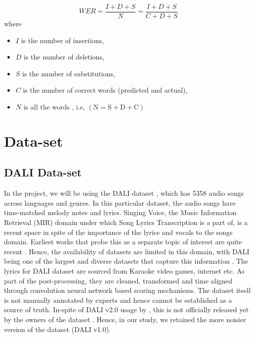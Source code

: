 $$
W E R=\frac{I + D + S}{N}=\frac{I+D+S}{C+D+S}
$$
where

\begin{itemize}
    \item $I$ is the number of insertions,
    \item $D$ is the number of deletions,
    \item $S$ is the number of substitutions,
    \item $C$ is the number of correct words (predicted and actual),
    
    \item $N$ is all the words , i.e, $(\mathrm{N}=\mathrm{S}+\mathrm{D}+\mathrm{C})$
\end{itemize}


\section{Data-set}%
\label{sec:dataset}

\subsection{DALI Data-set}
\label{subsec:dalidataset}

In the project, we will be using the DALI dataset \cite{meseguer2020creating}, which has 5358 audio songs across languages and genres. In this particular dataset, the audio songs have time-matched melody notes and lyrics. Singing Voice, the Music Information Retrieval (MIR) domain under which Song Lyrics Transcription is a part of, is a recent space in spite of the importance of the lyrics and vocals to the songs domain. Earliest works that probe this as a separate topic of interest are quite recent \cite{fujihara2012lyrics} \cite{mesaros2013singing}. Hence, the availability of datasets are limited in this domain, with DALI being one of the largest and diverse datasets that capture this information \cite{ou2022transfer}. The lyrics for DALI dataset are sourced from Karaoke video games, internet etc. As part of the post-processing, they are cleaned, transformed and time aligned through convolution neural network based scoring mechanisms. The dataset itself is not manually annotated by experts and hence cannot be established as a source of truth. In-spite of DALI v2.0 usage by \cite{ou2022transfer}, this is not officially released yet by the owners of the dataset \cite{dalireleases}. Hence, in our study, we retained the more noisier version of the dataset (DALI v1.0). 


